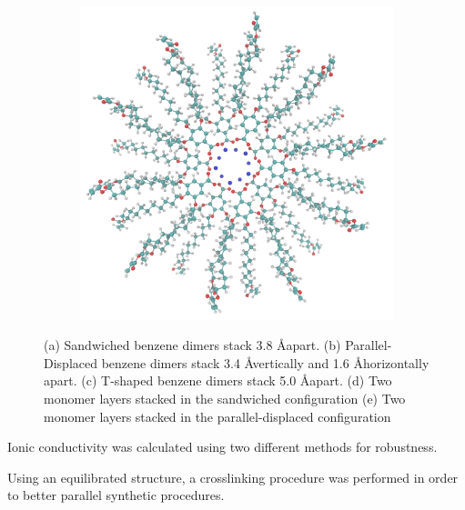 \documentclass{article}
\newcommand{\angstrom}{\textup{\AA}}
\begin{document}
\begin{figure}[H]
\begin{subfigure}[b]{0.475\textwidth}
		\caption{}\label{fig:sandwichedlayers}
	\end{subfigure}
	\begin{subfigure}[b]{0.475\textwidth}
		\centering
		\includegraphics[width=\textwidth]{offsetlayers.png}
		\caption{}\label{fig:offsetlayers}
	\end{subfigure}
	\caption{(a) Sandwiched benzene dimers stack 3.8 \angstrom apart. (b) Parallel-Displaced benzene dimers stack
	3.4 \angstrom vertically and 1.6 \angstrom horizontally apart. (c) T-shaped benzene dimers stack 5.0 \angstrom apart. 
	(d) Two monomer layers stacked in the sandwiched configuration (e) Two monomer layers stacked in the parallel-displaced
	configuration }\label{fig:stacking}
  \end{figure}
  
  Ionic conductivity was calculated using two different methods for
  robustness.
  
  Using an equilibrated structure, a crosslinking procedure was performed
  in order to better parallel synthetic procedures. 
\end{document}
